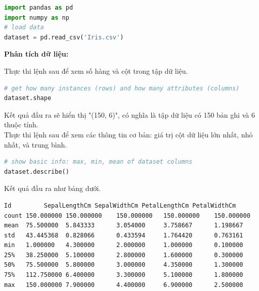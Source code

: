\begin{center}
\begin{lstlisting}[language=Python,breaklines=true]
import pandas as pd
import numpy as np
# load data
dataset = pd.read_csv('Iris.csv')
\end{lstlisting}
\end{center}

\textbf{Phân tích dữ liệu:}

Thực thi lệnh sau để xem số hàng và cột trong tập dữ liệu.

\begin{center}
\begin{lstlisting}[language=Python,breaklines=true]
# get how many instances (rows) and how many attributes (columns)
dataset.shape
\end{lstlisting}
\end{center}

Kết quả đầu ra sẽ hiển thị "(150, 6)", có nghĩa là tập dữ liệu có 150 bản ghi và 6 thuộc tính.\\

Thực thi lệnh sau để xem các thông tin cơ bản: giá trị cột dữ liệu lớn nhất, nhỏ nhất, và trung bình.

\begin{center}
\begin{lstlisting}[language=Python,breaklines=true]
# show basic info: max, min, mean of dataset columns
dataset.describe()
\end{lstlisting}
\end{center}

Kết quả đầu ra như bảng dưới.

\begin{center}
\begin{lstlisting}[basicstyle=\fontsize{10}{13}\selectfont\ttfamily]
      Id         SepalLengthCm SepalWidthCm PetalLengthCm PetalWidthCm
count 150.000000 150.000000    150.000000   150.000000    150.000000
mean  75.500000  5.843333      3.054000     3.758667      1.198667
std   43.445368  0.828066      0.433594     1.764420      0.763161
min   1.000000   4.300000      2.000000     1.000000      0.100000
25%   38.250000  5.100000      2.800000     1.600000      0.300000
50%   75.500000  5.800000      3.000000     4.350000      1.300000
75%   112.750000 6.400000      3.300000     5.100000      1.800000
max   150.000000 7.900000      4.400000     6.900000      2.500000
\end{lstlisting}
\end{center}

